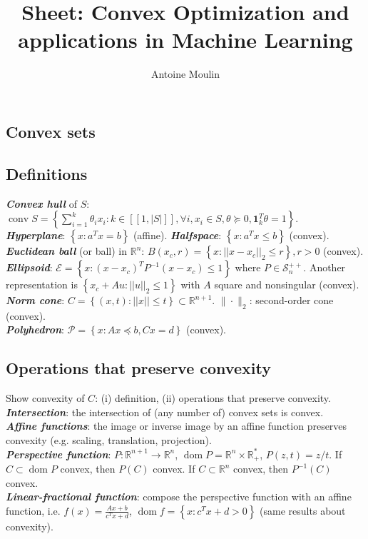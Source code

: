 \documentclass[a4paper, 11pt, twocolumn, landscape]{article}
\title{Sheet: Convex Optimization and applications in Machine Learning}
\author{Antoine Moulin}
\date{}
\theoremstyle{lemma-style}
\theoremstyle{thm-style}
\theoremstyle{prop-style}
\theoremstyle{cor-style}
\newcommand{\R}{\mathbb{R}}
\newcommand{\Rn}{\mathbb{R}^{n}}
\DeclareMathOperator{\dom}{dom}
\DeclareMathOperator{\conv}{conv}
\renewcommand{\emph}[1]{\textbf{\textit{#1}}}
\begin{document}
\begin{small}



\newpage
\section{Convex sets}
\vspace{-7pt}
	\subsection{Definitions}
\vspace{-7pt}

\emph{Convex hull} of $S$: $\conv S = \left\{ \sum_{i = 1}^{k} \theta_{i} x_{i}: k \in [\![ 1, |S| ]\!], \forall i, x_{i} \in S, \theta \succeq 0, \mathbf{1}_{k}^{T} \theta = 1 \right\}$. \\
\emph{Hyperplane}: $\left\{ x: a^{T}x = b \right\}$ (affine). \emph{Halfspace}: $\left\{ x: a^{T}x \leq b \right\}$ (convex). \\
\emph{Euclidean ball} (or ball) in $\Rn$: $B(x_{c}, r) = \left\{ x: ||x - x_{c}||_{2} \leq r \right\}, r > 0$ (convex). \\
\emph{Ellipsoid}: $\mathcal{E} = \left\{ x: (x - x_{c})^{T} P^{-1} (x - x_{c}) \leq 1 \right\}$
where $P \in \mathcal{S}_{n}^{++}$. Another representation is $\left\{ x_{c} + Au: ||u||_{2} \leq 1 \right\}$ with $A$ square and nonsingular (convex). \\
\emph{Norm cone}: $C = \left\{ (x, t): ||x|| \leq t \right\} \subset \mathbb{R}^{n+1}$. $\|\cdot\|_{2}$: second-order cone (convex). \\
\emph{Polyhedron}: $\mathcal{P} = \left\{ x: Ax \preceq b, Cx = d \right\}$ (convex).

\vspace{-10pt}
	\subsection{Operations that preserve convexity}

Show convexity of $C$: (i) definition, (ii) operations that preserve convexity. \\
\emph{Intersection}: the intersection of (any number of) convex sets is convex. \\
\emph{Affine functions}: the image or inverse image by an affine function preserves convexity (e.g. scaling, translation, projection). \\
\emph{Perspective function}: $P: \mathbb{R}^{n+1} \rightarrow \Rn$, $\dom P = \Rn \times \R_{+}^{*}$, $P(z, t) = z / t$. If $C \subset \dom P$ convex, then $P(C)$ convex. If $C \subset \Rn$ convex, then $P^{-1}(C)$ convex. \\
\emph{Linear-fractional function}: compose the perspective function with an affine function, i.e. $f(x) = \frac{Ax + b}{c^{T}x + d}$, $\dom f = \left\{ x: c^{T}x + d > 0 \right\}$ (same results about convexity).


\end{small}
\end{document}
